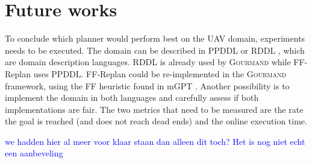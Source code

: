 \documentclass[runningheads,a4paper]{llncs}
\newcommand\todo[1]{\textcolor{blue}{#1}}
\begin{document}

\section{Future works}

To conclude which planner would perform best on the UAV domain, experiments
needs to be executed. The domain can be described in PPDDL
\cite{younes2004ppddl1} or RDDL \cite{Sanner:RDDL}, which are domain
description languages. RDDL is already used by \textsc{Gourmand} while
FF-Replan uses PPDDL\@. FF-Replan could be re-implemented in the
\textsc{Gourmand} framework, using the FF heuristic found in mGPT
\cite{bonet2011planning}. Another possibility is to implement the domain in
both languages and carefully assess if both implementations are fair.  The two
metrics that need to be measured are the rate the goal is reached (and does not
reach dead ends) and the online execution time.

\todo{we hadden hier al meer voor klaar staan dan alleen dit toch? Het is nog niet echt een aanbeveling}



\end{document}
